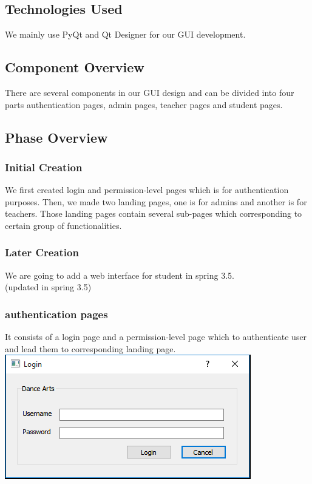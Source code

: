 \subsection{Technologies  Used}
We mainly use PyQt and Qt Designer for our GUI development.

\subsection{Component  Overview}
There are several components in our GUI design and can be divided into four parts authentication pages, admin pages, teacher pages and student pages.

\subsection{Phase Overview}
\subsubsection{Initial Creation}
We first created login and permission-level pages which is for authentication purposes. Then, we made two landing pages, one is for admins and another is for teachers. Those landing pages contain several sub-pages which corresponding to certain group of functionalities.
\subsubsection{Later Creation}
We are going to add a web interface for student in spring 3.5.\\
(updated in spring 3.5)\\
 
\subsubsection{authentication pages}
It consists of a login page and a permission-level page which to authenticate user and lead them to corresponding landing page.\\
\includegraphics[scale=0.7]{pics/login_page.png}

